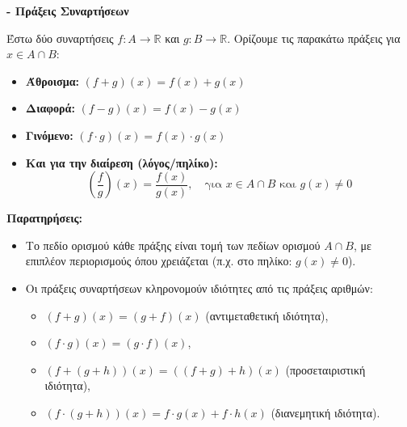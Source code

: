 {\large \textbf{- Πράξεις Συναρτήσεων}}
\vspace{1em}

Έστω δύο συναρτήσεις $f: A \to \mathbb{R}$ και $g: B \to \mathbb{R}$.
Ορίζουμε τις παρακάτω πράξεις για $x \in A \cap B$:

\begin{itemize}
  \item \textbf{Άθροισμα:} $(f+g)(x) = f(x) + g(x)$
  \item \textbf{Διαφορά:} $(f-g)(x) = f(x) - g(x)$
  \item \textbf{Γινόμενο:} $(f \cdot g)(x) = f(x) \cdot g(x)$
  \item \textbf{Και για την διαίρεση (λόγος/πηλίκο):}
  \[
   \left(\frac{f}{g}\right)(x) = \frac{f(x)}{g(x)}, \quad \text{για } x \in A \cap B \text{ και } g(x) \neq 0
  \]
\end{itemize}

\vspace{0.5em}

\textbf{Παρατηρήσεις:}
\begin{itemize}
  \item Το πεδίο ορισμού κάθε πράξης είναι τομή των πεδίων ορισμού $A \cap B$, με επιπλέον περιο\-ρισμούς όπου χρειάζεται (π.χ. στο πηλίκο: $g(x)\neq 0$).
  \item Οι πράξεις συναρτήσεων κληρονομούν ιδιότητες από τις πράξεις αριθμών:
    \begin{itemize}
      \item $(f+g)(x) = (g+f)(x)$ (αντιμεταθετική ιδιότητα),
      \item $(f \cdot g)(x) = (g \cdot f)(x)$,
      \item $(f+(g+h))(x) = ((f+g)+h)(x)$ (προσεταιριστική ιδιότητα),
      \item $(f \cdot (g+h))(x) = f \cdot g(x) + f \cdot h(x)$ (διανεμητική ιδιότητα).
    \end{itemize}
\end{itemize}

